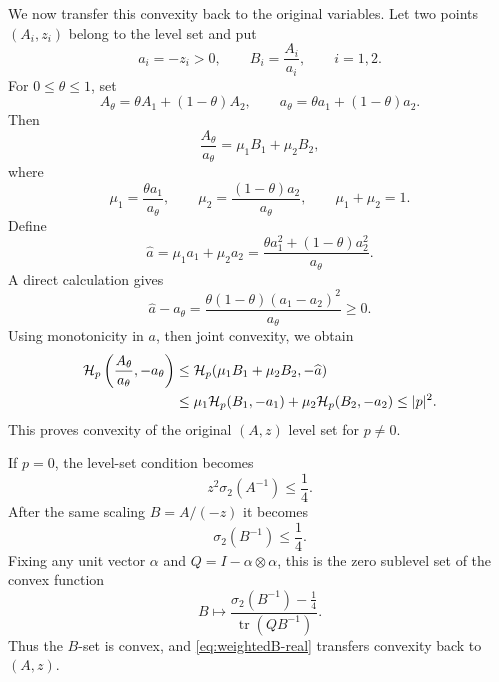 \documentclass{article}
\newcommand{\tr}{\operatorname{tr}}
\numberwithin{equation}{section}
\begin{document}
We now transfer this convexity back to the original variables. Let two points $(A_i,z_i)$ belong to the level set and put
\begin{equation}\label{eq:aiBi-real}
a_i=-z_i>0,
\qquad
B_i=\frac{A_i}{a_i},
\qquad i=1,2.
\end{equation}
For $0\le\theta\le1$, set
\begin{equation}\label{eq:Atheta-real}
A_\theta=\theta A_1+(1-\theta)A_2,
\qquad
a_\theta=\theta a_1+(1-\theta)a_2.
\end{equation}
Then
\begin{equation}\label{eq:weightedB-real}
\frac{A_\theta}{a_\theta}
=\mu_1B_1+\mu_2B_2,
\end{equation}
where
\begin{equation}\label{eq:mureal}
\mu_1=\frac{\theta a_1}{a_\theta},
\qquad
\mu_2=\frac{(1-\theta)a_2}{a_\theta},
\qquad
\mu_1+\mu_2=1.
\end{equation}
Define
\begin{equation}\label{eq:ahat-real}
\widehat a=\mu_1a_1+\mu_2a_2
=\frac{\theta a_1^2+(1-\theta)a_2^2}{a_\theta}.
\end{equation}
A direct calculation gives
\begin{equation}\label{eq:ahat-diff-real}
\widehat a-a_\theta
=\frac{\theta(1-\theta)(a_1-a_2)^2}{a_\theta}\ge0.
\end{equation}
Using monotonicity in $a$, then joint convexity, we obtain
\begin{align}
\mathcal H_p\left(\frac{A_\theta}{a_\theta},-a_\theta\right)
&\le
\mathcal H_p(\mu_1B_1+\mu_2B_2,-\widehat a)
\notag\\
&\le
\mu_1\mathcal H_p(B_1,-a_1)
+\mu_2\mathcal H_p(B_2,-a_2)
\le |p|^2.
\label{eq:return-real}
\end{align}
This proves convexity of the original $(A,z)$ level set for $p\neq0$.

If $p=0$, the level-set condition becomes
\[
z^2\sigma_2(A^{-1})\le\frac14.
\]
After the same scaling $B=A/(-z)$ it becomes
\[
\sigma_2(B^{-1})\le\frac14.
\]
Fixing any unit vector $\alpha$ and $Q=I-\alpha\otimes\alpha$, this is the zero sublevel set of the convex function
\[
B\longmapsto\frac{\sigma_2(B^{-1})-\frac14}{\tr(QB^{-1})}.
\]
Thus the $B$-set is convex, and \eqref{eq:weightedB-real} transfers convexity back to $(A,z)$.
\end{document}
